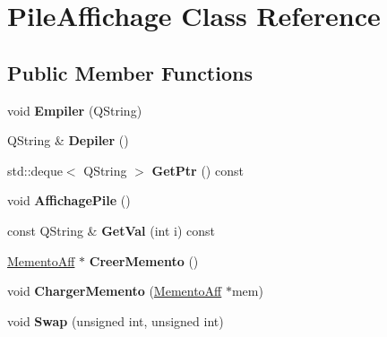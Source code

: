 \hypertarget{class_pile_affichage}{\section{Pile\-Affichage Class Reference}
\label{class_pile_affichage}
}
\subsection*{Public Member Functions}
\begin{DoxyCompactItemize}
\item 
\hypertarget{class_pile_affichage_a11bce902517d97e237f99bb36b31bda4}{void {\bfseries Empiler} (Q\-String)}\label{class_pile_affichage_a11bce902517d97e237f99bb36b31bda4}

\item 
\hypertarget{class_pile_affichage_aad2fa732744c8c03ff3f5fa2df874c24}{Q\-String \& {\bfseries Depiler} ()}\label{class_pile_affichage_aad2fa732744c8c03ff3f5fa2df874c24}

\item 
\hypertarget{class_pile_affichage_a5daee2843e955b5f3317ba56e8e99050}{std\-::deque$<$ Q\-String $>$ {\bfseries Get\-Ptr} () const }\label{class_pile_affichage_a5daee2843e955b5f3317ba56e8e99050}

\item 
\hypertarget{class_pile_affichage_a113c2fe93662381bfb58d789123da818}{void {\bfseries Affichage\-Pile} ()}\label{class_pile_affichage_a113c2fe93662381bfb58d789123da818}

\item 
\hypertarget{class_pile_affichage_a04a490c8ab59101a171f1c5cb35a510f}{const Q\-String \& {\bfseries Get\-Val} (int i) const }\label{class_pile_affichage_a04a490c8ab59101a171f1c5cb35a510f}

\item 
\hypertarget{class_pile_affichage_a099c0579bdd31bea548a6fb06e859197}{\hyperlink{class_memento_aff}{Memento\-Aff} $\ast$ {\bfseries Creer\-Memento} ()}\label{class_pile_affichage_a099c0579bdd31bea548a6fb06e859197}

\item 
\hypertarget{class_pile_affichage_aa1eaa41dcfa6317f54f36e3f145dbc4b}{void {\bfseries Charger\-Memento} (\hyperlink{class_memento_aff}{Memento\-Aff} $\ast$mem)}\label{class_pile_affichage_aa1eaa41dcfa6317f54f36e3f145dbc4b}

\item 
\hypertarget{class_pile_affichage_a5768dff9a1bf067cd7ae10567c0dd6a8}{void {\bfseries Swap} (unsigned int, unsigned int)}\label{class_pile_affichage_a5768dff9a1bf067cd7ae10567c0dd6a8}


\end{DoxyCompactItemize}
